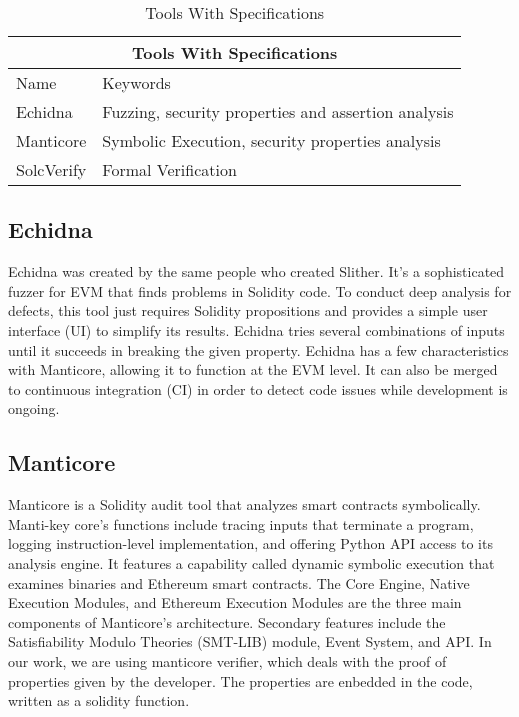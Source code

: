 \documentclass[a4paper,sigconf, language=french,
language=german, language=spanish, language=english]{acmart}
\begin{document}
\begin{table*}
  \caption{Tools With Specifications}
  \label{TollsWithSpec}
  \begin{tabular}{ |p{5cm}|p{5cm}|  }
    \hline
    \multicolumn{2}{|c|}{Tools With Specifications }\\
    \hline
    Name & Keywords \\
    \hline 
    Echidna  & Fuzzing, security properties and assertion analysis\\
    \hline
    Manticore  & Symbolic Execution, security properties analysis \\
    \hline
    SolcVerify & Formal Verification \\
  \end{tabular}
\end{table*}
\subsection{Echidna} Echidna was created by the same people who created Slither.
It's a sophisticated fuzzer for EVM that finds problems in Solidity code.
To conduct deep analysis for defects, this tool just requires Solidity propositions and provides a simple user interface (UI) to simplify its results.
Echidna tries several combinations of inputs until it succeeds in breaking the given property.
Echidna has a few characteristics with Manticore, allowing it to function at the EVM level.
It can also be merged to continuous integration (CI) in order to detect code issues while development is ongoing. 

\subsection{Manticore} Manticore is a Solidity audit tool that analyzes smart contracts symbolically.
Manti-key core's functions include tracing inputs that terminate a program, logging instruction-level implementation, and offering Python API access to its analysis engine.
It features a capability called dynamic symbolic execution that examines binaries and Ethereum smart contracts.
The Core Engine, Native Execution Modules, and Ethereum Execution Modules are the three main components of Manticore's architecture.
Secondary features include the Satisfiability Modulo Theories (SMT-LIB) module, Event System, and API. 
In our work, we are using manticore verifier, which deals with the proof of properties given by the developer. 
The properties are enbedded in the code, written as a solidity function.
\end{document}
